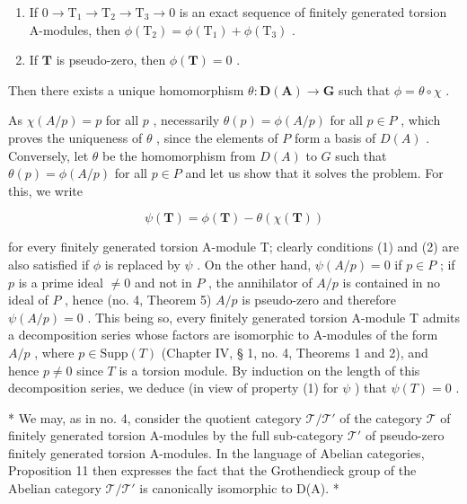 \begin{enumerate}
\def\labelenumi{(\arabic{enumi})}
\item
  If \(0 \to \mathrm{T}_1 \to \mathrm{T}_2 \to \mathrm{T}_3 \to 0\) is an exact sequence of finitely generated torsion A-modules, then \(\phi(\mathrm{T}_2) = \phi(\mathrm{T}_1) + \phi(\mathrm{T}_3)\) .
\item
  If \(\mathbf{T}\) is pseudo-zero, then \(\phi (\mathbf{T}) = 0\) .
\end{enumerate}

Then there exists a unique homomorphism \(\theta: \mathbf{D}(\mathbf{A}) \to \mathbf{G}\) such that \(\phi = \theta \circ \chi\) .

As \(\chi(A/p) = p\) for all \(p\) , necessarily \(\theta(p) = \phi(A/p)\) for all \(p \in P\) , which proves the uniqueness of \(\theta\) , since the elements of \(P\) form a basis of \(D(A)\) . Conversely, let \(\theta\) be the homomorphism from \(D(A)\) to \(G\) such that \(\theta(p) = \phi(A/p)\) for all \(p \in P\) and let us show that it solves the problem. For this, we write

\[
\psi (\mathbf {T}) = \phi (\mathbf {T}) - \theta (\chi (\mathbf {T}))
\]

for every finitely generated torsion A-module T; clearly conditions (1) and (2) are also satisfied if \(\phi\) is replaced by \(\psi\) . On the other hand, \(\psi(A/p) = 0\) if \(p \in P\) ; if \(p\) is a prime ideal \(\neq 0\) and not in \(P\) , the annihilator of \(A/p\) is contained in no ideal of \(P\) , hence (no. 4, Theorem 5) \(A/p\) is pseudo-zero and therefore \(\psi(A/p) = 0\) . This being so, every finitely generated torsion A-module T admits a decomposition series whose factors are isomorphic to A-modules of the form \(A/p\) , where \(p \in \text{Supp}(T)\) (Chapter IV, § 1, no. 4, Theorems 1 and 2), and hence \(p \neq 0\) since \(T\) is a torsion module. By induction on the length of this decomposition series, we deduce (in view of property (1) for \(\psi\) ) that \(\psi(T) = 0\) .

* We may, as in no. 4, consider the quotient category \(\mathcal{T} / \mathcal{T}'\) of the category \(\mathcal{T}\) of finitely generated torsion A-modules by the full sub-category \(\mathcal{T}'\) of pseudo-zero finitely generated torsion A-modules. In the language of Abelian categories, Proposition 11 then expresses the fact that the Grothendieck group of the Abelian category \(\mathcal{T} / \mathcal{T}'\) is canonically isomorphic to D(A). *

